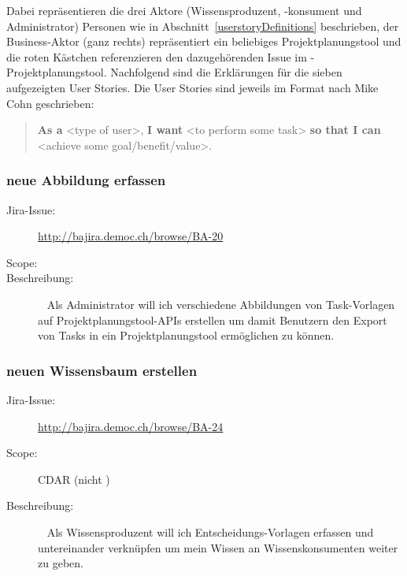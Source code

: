 		Dabei repräsentieren die drei Aktore (Wissensproduzent, -konsument und Administrator) Personen wie in Abschnitt~\ref{userstoryDefinitions} beschrieben,
		der Business-Aktor (ganz rechts) repräsentiert ein beliebiges Projektplanungstool und die roten Kästchen referenzieren den dazugehörenden Issue im \eeppi-Projektplanungstool.
		Nachfolgend sind die Erklärungen für die sieben aufgezeigten User Stories.
		Die User Stories sind jeweils im Format nach Mike Cohn\cite{jonathanRasmussonTheAgileSamurai} geschrieben:
		\begin{quote}
			\textbf{As a} <type of user>,\newline
			\textbf{I want} <to perform some task>\newline
			\textbf{so that I can} <achieve some goal/benefit/value>.
		\end{quote}
		
	\subsubsection{neue Abbildung erfassen}
		\begin{description}
			\item[Jira-Issue:] \url{http://bajira.democ.ch/browse/BA-20}
			\item[Scope:] \eeppi
			\item[Beschreibung:]\ \newline
				Als Administrator\newline
				will ich verschiedene Abbildungen von Task-Vorlagen auf Projektplanungstool-APIs erstellen\newline
				um damit Benutzern den Export von Tasks in ein Projektplanungstool ermöglichen zu können.
		\end{description}

	\subsubsection{neuen Wissensbaum erstellen}
		\begin{description}
			\item[Jira-Issue:] \url{http://bajira.democ.ch/browse/BA-24}
			\item[Scope:] CDAR (nicht \eeppi)
			\item[Beschreibung:]\ \newline
				Als Wissensproduzent\newline
				will ich Entscheidungs-Vorlagen erfassen und untereinander verknüpfen\newline
				um mein Wissen an Wissenskonsumenten weiter zu geben.
		\end{description}

